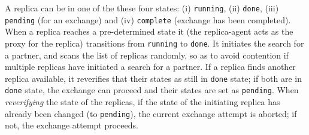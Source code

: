 \documentclass{rspublic}
\newcommand{\jhanote}[1]{ {\textcolor{red} { ***shantenu: #1 }}}
\newcommand{\alnote}[1]{ {\textcolor{blue} { ***andre: #1 }}}
\newcommand{\athotanote}[1]{ {\textcolor{green} { ***athota: #1 }}}
\newcommand{\alnote}[1]{}
\newcommand{\athotanote}[1]{}
\newcommand{\jhanote}[1]{}
\begin{document}





A replica can be in one of the these four states: (i)
\texttt{running}, (ii) \texttt{done}, (iii) \texttt{pending} (for an
exchange) and (iv) \texttt{complete} (exchange has been completed).
When a replica reaches a pre-determined state it (the replica-agent
acts as the proxy for the replica) transitions from \texttt{running}
to \texttt{done}. It initiates the search for a partner, and scans the
list of replicas randomly, so as to avoid contention if multiple
replicas have initiated a search for a partner.  If a replica finds
another replica available, it reverifies that their states as still in
\texttt{done} state; if both are in \texttt{done} state, the exchange
can proceed and their states are set as \texttt{pending}.  When {\it
  reverifying} the state of the replicas, if the state of the
initiating replica has already been changed (to \texttt{pending}), the
current exchange attempt is aborted; if not, the exchange attempt
proceeds.

\end{document}
